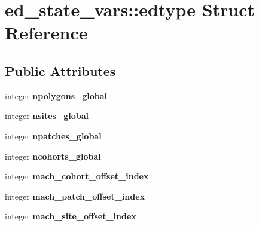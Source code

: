 \hypertarget{structed__state__vars_1_1edtype}{
\section{ed\_\-state\_\-vars::edtype Struct Reference}
\label{structed__state__vars_1_1edtype}
}
\subsection*{Public Attributes}
\begin{DoxyCompactItemize}
\item 
\hypertarget{structed__state__vars_1_1edtype_a2c9a6eb0f55ef25763cf967357195ca2}{
integer {\bfseries npolygons\_\-global}}
\label{structed__state__vars_1_1edtype_a2c9a6eb0f55ef25763cf967357195ca2}

\item 
\hypertarget{structed__state__vars_1_1edtype_ada7b964660b48ec6ff1927bac0a01cd8}{
integer {\bfseries nsites\_\-global}}
\label{structed__state__vars_1_1edtype_ada7b964660b48ec6ff1927bac0a01cd8}

\item 
\hypertarget{structed__state__vars_1_1edtype_a95115e0bd4e31a2349c5e225a52bcc49}{
integer {\bfseries npatches\_\-global}}
\label{structed__state__vars_1_1edtype_a95115e0bd4e31a2349c5e225a52bcc49}

\item 
\hypertarget{structed__state__vars_1_1edtype_a3218809e78c5790be2aa3832b803b10c}{
integer {\bfseries ncohorts\_\-global}}
\label{structed__state__vars_1_1edtype_a3218809e78c5790be2aa3832b803b10c}

\item 
\hypertarget{structed__state__vars_1_1edtype_aaaf033dcc09ae1494f79c4872c6f6b85}{
integer {\bfseries mach\_\-cohort\_\-offset\_\-index}}
\label{structed__state__vars_1_1edtype_aaaf033dcc09ae1494f79c4872c6f6b85}

\item 
\hypertarget{structed__state__vars_1_1edtype_a5f04b25303ad67acc6b8f55bff6a2b9f}{
integer {\bfseries mach\_\-patch\_\-offset\_\-index}}
\label{structed__state__vars_1_1edtype_a5f04b25303ad67acc6b8f55bff6a2b9f}

\item 
\hypertarget{structed__state__vars_1_1edtype_aeb238f3203ef1ea2aeb8fa1281c534a2}{
integer {\bfseries mach\_\-site\_\-offset\_\-index}}
\label{structed__state__vars_1_1edtype_aeb238f3203ef1ea2aeb8fa1281c534a2}


\end{DoxyCompactItemize}
